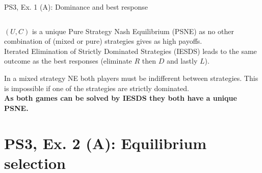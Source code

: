 \begin{frame}{PS3, Ex. 1 (A): Dominance and best response}
\begin{multicols}{2}
\begin{table}
\begin{tabular}{cc|c|c|c|}
      \end{tabular}
    \end{table}
    $(U,C)$ is a unique Pure Strategy Nash Equilibrium (PSNE) as no other combination of (mixed or pure) strategies gives as high payoffs.\\\medskip
    Iterated Elimination of Strictly Dominated Strategies (IESDS) leads to the same outcome as the best responses (eliminate $R$ then $D$ and lastly $L$).
  \vfill\null
  \end{multicols}
  In a mixed strategy NE both players must be indifferent between strategies. This is impossible if one of the strategies are strictly dominated.\\\medskip
  \textbf{As both games can be solved by IESDS they both have a unique PSNE.}
\end{frame}


\section{PS3, Ex. 2 (A): Equilibrium selection}

